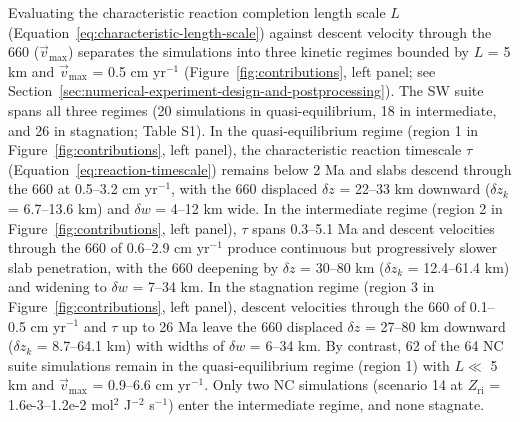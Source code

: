 \documentclass[draft,linenumbers]{agujournal2019}
\newcounter{none}
\begin{document}
Evaluating the characteristic reaction completion length scale \(L\)
(Equation~\ref{eq:characteristic-length-scale}) against descent velocity
through the 660 (\(\vec{v}_\mathrm{max}\)) separates the simulations
into three kinetic regimes bounded by \(L\) = 5 km and
\(\vec{v}_\mathrm{max}\) = 0.5 cm yr\(^{-1}\)
(Figure~\ref{fig:contributions}, left panel; see
Section~\ref{sec:numerical-experiment-design-and-postprocessing}). The
SW suite spans all three regimes (20 simulations in quasi-equilibrium,
18 in intermediate, and 26 in stagnation; Table S1). In the
quasi-equilibrium regime (region 1 in Figure~\ref{fig:contributions},
left panel), the characteristic reaction timescale \(\tau\)
(Equation~\ref{eq:reaction-timescale}) remains below 2 Ma and slabs
descend through the 660 at 0.5--3.2 cm yr\(^{-1}\), with the 660
displaced \(\delta z\) = 22--33 km downward (\(\delta z_k\) = 6.7--13.6
km) and \(\delta w\) = 4--12 km wide. In the intermediate regime (region
2 in Figure~\ref{fig:contributions}, left panel), \(\tau\) spans
0.3--5.1 Ma and descent velocities through the 660 of 0.6--2.9 cm
yr\(^{-1}\) produce continuous but progressively slower slab
penetration, with the 660 deepening by \(\delta z\) = 30--80 km
(\(\delta z_k\) = 12.4--61.4 km) and widening to \(\delta w\) = 7--34
km. In the stagnation regime (region 3 in
Figure~\ref{fig:contributions}, left panel), descent velocities through
the 660 of 0.1--0.5 cm yr\(^{-1}\) and \(\tau\) up to 26 Ma leave the
660 displaced \(\delta z\) = 27--80 km downward (\(\delta z_k\) =
8.7--64.1 km) with widths of \(\delta w\) = 6--34 km. By contrast, 62 of
the 64 NC suite simulations remain in the quasi-equilibrium regime
(region 1) with \(L \ll\) 5 km and \(\vec{v}_\mathrm{max}\) = 0.9--6.6
cm yr\(^{-1}\). Only two NC simulations (scenario 14 at
\(Z_\mathrm{ri}\) = 1.6e-3--1.2e-2 mol\(^2\) J\(^{-2}\) s\(^{-1}\))
enter the intermediate regime, and none stagnate.
\end{document}
